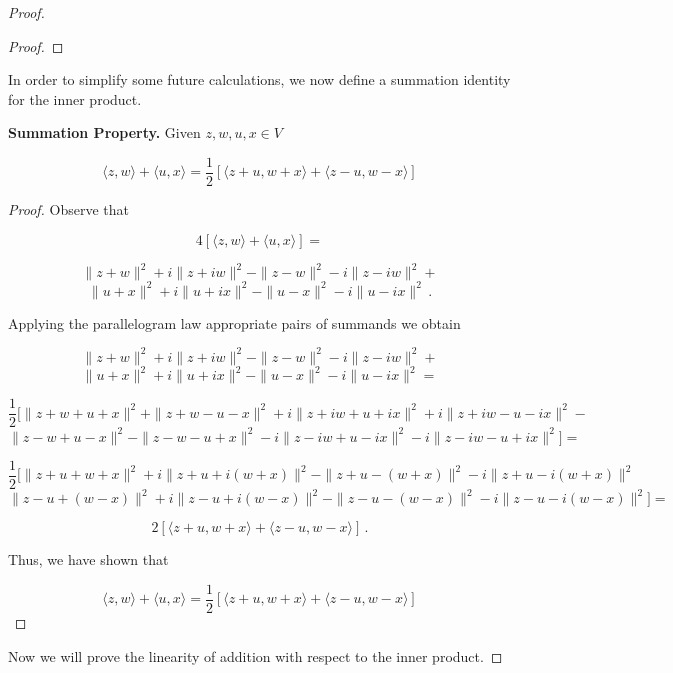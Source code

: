 \documentclass[a4paper]{article}
\numberwithin{equation}{section}
\begin{document}
\begin{description}
\begin{proof}
\begin{description}
\begin{proof}
\end{proof}

\end{description}


In order to simplify some future calculations, we now define a summation identity for the inner product.


\begin{description}

\item\textbf{Summation Property.} Given $z,w,u,x \in V$

$$\langle z,w \rangle + \langle u,x \rangle = \frac{1}{2}[\langle z+u,w+x \rangle + \langle z-u,w-x \rangle]$$

\begin{proof} Observe that 

$$4[\langle z, w \rangle + \langle u, x \rangle] = $$

$$\|z+w\|^2 + i\|z+iw\|^2 - \|z-w\|^2 - i\|z-iw\|^2 + $$
$$\|u+x\|^2 + i\|u+ix\|^2 - \|u-x\|^2 - i\|u-ix\|^2\,.$$

Applying the parallelogram law appropriate pairs of summands we obtain

$$\|z+w\|^2 + i\|z+iw\|^2 - \|z-w\|^2 - i\|z-iw\|^2 + $$
$$\|u+x\|^2 + i\|u+ix\|^2 - \|u-x\|^2 - i\|u-ix\|^2 = $$

$$\frac{1}{2}\big[\|z+w+u+x\|^2 + \|z+w-u-x\|^2 + i\|z+iw+u+ix\|^2 + i\|z+iw-u-ix\|^2 - $$
$$\|z-w+u-x\|^2 - \|z-w-u+x\|^2 -i\|z-iw+u-ix\|^2 - i\|z-iw-u+ix\|^2\big] = $$

$$\frac{1}{2}\big[\|z+u+w+x\|^2 + i\|z+u+i(w+x)\|^2 - \|z+u-(w+x)\|^2 - i\|z+u-i(w+x)\|^2$$
$$\|z-u+(w-x)\|^2 + i\|z-u+i(w-x)\|^2  - \|z-u-(w-x)\|^2  - i\|z-u - i(w-x)\|^2\big] = $$

$$2[\langle z+u,w+x \rangle + \langle z-u,w-x \rangle]\,.$$

Thus, we have shown that 

$$\langle z,w \rangle + \langle u,x \rangle=\frac{1}{2}[\langle z+u,w+x \rangle + \langle z-u,w-x \rangle]$$

\end{proof}

\end{description}


Now we will prove the linearity of addition with respect to the inner product.


\end{proof}
\end{description}
\end{document}
